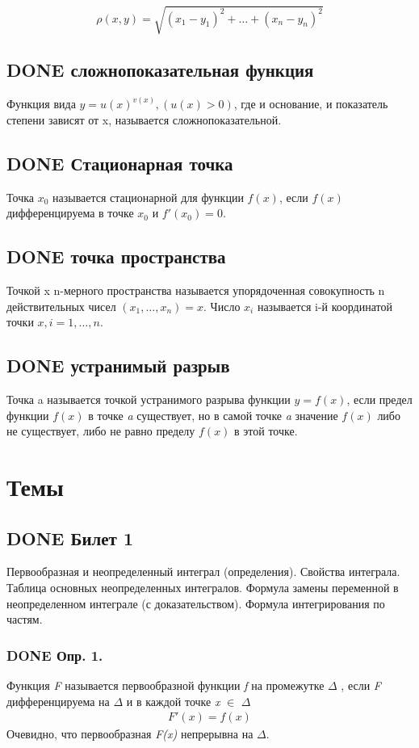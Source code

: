 \documentclass[11pt]{article}
\begin{document}
$$\rho(x,y)=\sqrt{(x_1−y_1)^2+…+(x_n−y_n)^2}$$
\subsection{{\bfseries\sffamily DONE} сложнопоказательная функция}
\label{sec:org7e26b47}
Функция вида \(y=u(x)^{v(x)},(u(x)>0)\), где и основание, и показатель степени зависят от x, называется сложнопоказательной.
\subsection{{\bfseries\sffamily DONE} Стационарная точка}
\label{sec:org99cad8a}
Точка \(x_0\) называется стационарной для функции \(f(x)\), если \(f(x)\) дифференцируема в точке \(x_0\) и \(f'(x_0)=0\).
\subsection{{\bfseries\sffamily DONE} точка пространства}
\label{sec:orgf10f603}
Точкой x n-мерного пространства называется упорядоченная совокупность n действительных чисел \((x_1,…,x_n)=x\).
Число \(x_i\) называется i-й координатой точки \(x, i=1,…,n\).
\subsection{{\bfseries\sffamily DONE} устранимый разрыв}
\label{sec:org2bf8e80}
Точка a называется точкой устранимого разрыва функции \(y=f(x)\), если предел функции \(f(x)\) в точке \emph{a} существует, но в самой точке \emph{a} значение \(f(x)\) либо не существует, либо не равно пределу \(f(x)\) в этой точке. 
\section{Темы}
\label{sec:orgdab8f4f}
\subsection{{\bfseries\sffamily DONE} Билет 1}
\label{sec:orgd57fab8}
Первообразная и неопределенный интеграл (определения). Свойства интеграла. Таблица основных неопределенных интегралов. Формула замены переменной в неопределенном интеграле (с доказательством). Формула интегрирования по частям.
\subsubsection{{\bfseries\sffamily DONE} Опр. 1.}
\label{sec:org3b6adf8}
Функция \emph{F} называется первообразной функции \emph{f} на промежутке \(\Delta\) , если \emph{F} дифференцируема на \(\Delta\) и в каждой точке \emph{x} \(\in\) \(\Delta\)
\begin{eqnarray}
F'(x)=f(x)
\end{eqnarray}
Очевидно, что первообразная \emph{F(x)} непрерывна на \(\Delta\).
\end{document}
